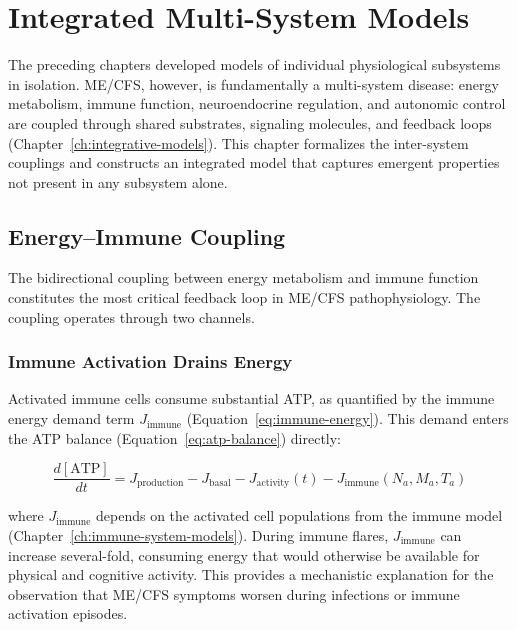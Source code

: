 \chapter{Integrated Multi-System Models}
\label{ch:integrated-systems}

The preceding chapters developed models of individual physiological subsystems in isolation. ME/CFS, however, is fundamentally a multi-system disease: energy metabolism, immune function, neuroendocrine regulation, and autonomic control are coupled through shared substrates, signaling molecules, and feedback loops (Chapter~\ref{ch:integrative-models}). This chapter formalizes the inter-system couplings and constructs an integrated model that captures emergent properties not present in any subsystem alone.



\section{Energy--Immune Coupling}
\label{sec:energy-immune-coupling}

The bidirectional coupling between energy metabolism and immune function constitutes the most critical feedback loop in ME/CFS pathophysiology. The coupling operates through two channels.

\subsection{Immune Activation Drains Energy}

Activated immune cells consume substantial ATP, as quantified by the immune energy demand term $J_{\text{immune}}$ (Equation~\ref{eq:immune-energy}). This demand enters the ATP balance (Equation~\ref{eq:atp-balance}) directly:

\begin{equation}
\label{eq:energy-immune-coupling}
\frac{d[\text{ATP}]}{dt} = J_{\text{production}} - J_{\text{basal}} - J_{\text{activity}}(t) - J_{\text{immune}}(N_a, M_a, T_a)
\end{equation}

where $J_{\text{immune}}$ depends on the activated cell populations from the immune model (Chapter~\ref{ch:immune-system-models}). During immune flares, $J_{\text{immune}}$ can increase several-fold, consuming energy that would otherwise be available for physical and cognitive activity. This provides a mechanistic explanation for the observation that ME/CFS symptoms worsen during infections or immune activation episodes.


